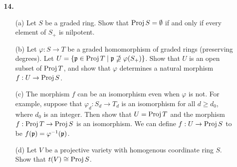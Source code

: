 \documentclass[a4paper]{article}
\begin{document}
\begin{enumerate} [label=\textbf{\arabic*.}, leftmargin=0em]
\begin{proof}
\begin{itemize} [leftmargin=0cm]
        \item[(b)] Let $\{ U_i \}_{i \in I}$ be an open cover of $\spec{A}$. We can assume $U_i$ to be basic open sets of the form $D(f_i)$ for some $f_i \in A$. If $\spec{A} = \bigcup D(f_i)$, then $V((f_i)_{i \in I}) = \emptyset$, which implies the ideal generated by $f_i$ is the entire ring $A$. That means there exists a finite number of elements $f_1, \dots f_n$ such that $\sum_{i = 1}^n a_i f_i = 1$ for some $a_i \in A$, hence $D(f_1), \dots, D(f_n)$ is a finite subcover of $\spec{A}$.

        \item[(c)] The descending chain of irreducible closed subsets in $\text{sp}(\spec{A})$ corresponds to an ascending chain of prime ideals in $A$. If $A$ is noetherian any ascending chain of ideals must terminate, hence the corresponding descending chain of irreducible closed subsets must terminate.

        \item[(d)] Let $A = \prod_{i = 1}^\infty k$, where $k$ is any field. The prime ideals of $A$ are of the form $\goth{p}_i = \cdots \times k \times 0 \times k \cdots$, so $\spec{A}$ has countably infinite number of points, and closed subsets of $\spec{A}$ are finite set of points. Hence, $\spec{A}$ is a noetherian topological space. However, $A$ itself is not noetherian, e.g. $0 \times 0 \times \cdots \subset k \times 0 \times 0 \times \cdots \subset k \times k \times 0 \times \cdots \subset \cdots$.
    \end{itemize}
\end{proof}

\item[\textbf{14.}]
\begin{itemize}
    \item[(a)] Let $S$ be a graded ring. Show that $\operatorname{Proj}{S} = \emptyset$ if and only if every element of $S_+$ is nilpotent.
    \item[(b)] Let $\varphi : S \to T$ be a graded homomorphism of graded rings (preserving degrees). Let $U = \{ \mathfrak{p} \in \operatorname{Proj}{T} \mid \mathfrak{p} \nsupseteq \varphi(S_+) \}$. Show that $U$ is an open subset of $\operatorname{Proj}{T}$, and show that $\varphi$ determines a natural morphism $f : U \to \operatorname{Proj}{S}$.
    \item[(c)] The morphism $f$ can be an isomorphism even when $\varphi$ is not. For example, suppose that $\varphi_d : S_d \to T_d$ is an isomorphism for all $d \geq d_0$, where $d_0$ is an integer. Then show that $U = \operatorname{Proj}{T}$ and the morphism $f : \operatorname{Proj}{T} \to \operatorname{Proj}{S}$ is an isomorphism. We can define $f : U \to \operatorname{Proj}{S}$ to be $f(\mathfrak{p}) = \varphi^{-1}(\mathfrak{p})$.
    \item[(d)] Let $V$ be a projective variety with homogenous coordinate ring $S$. Show that $t(V) \cong \operatorname{Proj}{S}$.
\end{itemize}


\end{enumerate}
\end{document}
